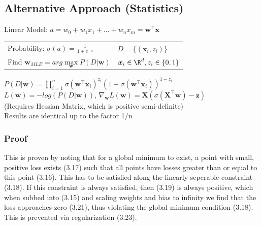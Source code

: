 \documentclass[english]{latex4ei/latex4ei_sheet}
\begin{document}
\begin{sectionbox}
\subsection{Alternative Approach (Statistics)}
Linear Model: $a = w_0+w_1x_1+...+w_nx_m = \boldsymbol{w}^{\top}\boldsymbol{x}$\\
\begin{tabular}{ll}
    Probability: $\sigma(a)=\frac{1}{1+e^{-a}}$ & $D=\{(\boldsymbol{x}_i,z_i)\}$\\
    Find $\boldsymbol{w}_{MLE}=arg \max\limits_{\boldsymbol{w}} P(D|\boldsymbol{w})$ &  $\boldsymbol{x}_i\in \R^d, z_i\in\{0,1\}$\\
\end{tabular}
$P(D|\boldsymbol{w})=\prod\limits_{i=1}^n\sigma(\boldsymbol{w}^{\top}\boldsymbol{x}_i)^{z_i}(1-\sigma(\boldsymbol{w}^{\top}\boldsymbol{x}_i))^{1-z_i}$\\
$L(\boldsymbol{w})=-log(P(D|\boldsymbol{w}))$, $\nabla_{\boldsymbol{w}}L(\boldsymbol{w})=\boldsymbol{X}(\sigma(\boldsymbol{X}^{\top}\boldsymbol{w})-\boldsymbol{z})$\\
(Requires Hessian Matrix, which is positive semi-definite)\\
Results are identical up to the factor 1/n
\\
\subsubsection{Proof}
This is proven by noting that for a global minimum to exist, a point with small, positive loss exists (3.17) such that all points have losses greater than or equal to this point (3.16). This has to be satisfied along the linearly seperable constraint (3.18). If this constraint is always satisfied, then (3.19) is always positive, which when subbed into (3.15) and scaling weights and bias to infinity we find that the loss approaches zero (3.21), thus violating the global minimum condition (3.18). This is prevented via regularization (3.23).
\end{sectionbox}
\end{document}
